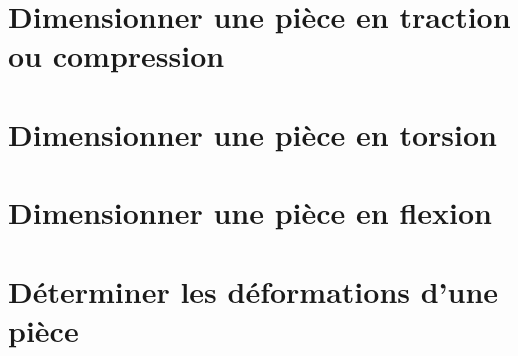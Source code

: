 \graphicspath{{\repStyle/png/}{../RDM/RDM-01-Cohesion/529_Passerelle/images/}} 
 
 
\graphicspath{{\repStyle/png/}{../RDM/RDM-01-Cohesion/530_BancHelico/images/}} 
 
 
\section{Dimensionner une pièce en traction ou compression} 
\section{Dimensionner une pièce en torsion} 
\section{Dimensionner une pièce en flexion} 
\section{Déterminer les déformations d'une pièce} 
\graphicspath{{\repStyle/png/}{../RDM/RDM-05-Deformation/531_RdM/images/}} 
 
 
\graphicspath{{\repStyle/png/}{../RDM/RDM-05-Deformation/532_RdM/images/}} 
 
 
